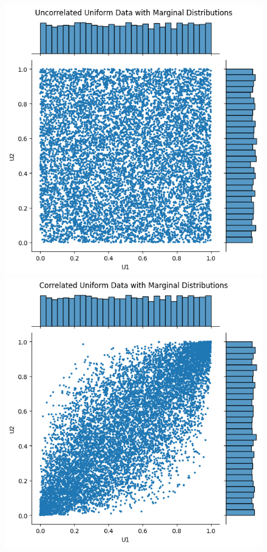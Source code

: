 \begin{figure}
\begin{minipage}{0.4\textwidth}
    \end{minipage}
    \vfill
    \begin{minipage}{0.4\textwidth}
        \centering
        \includegraphics[width=\textwidth]{3Theory/pictures/UncorrelatedUniformScatter.png}
    \end{minipage}
    \hfill
    \begin{minipage}{0.4\textwidth}
        \centering
        \includegraphics[width=\textwidth]{3Theory/pictures/CorrelatedUnoformScatter.png}

\end{minipage}
\end{figure}
